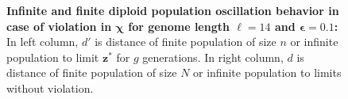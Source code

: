 \begin{figure}[h]
\begin{center}
\hspace{-3em}%
\vspace{-0.5em}  \hspace{-3em}%


\caption{\textbf{Infinite and finite diploid population oscillation behavior in case of violation in $\bm{\chi}$ for genome length $\ell = 14$ and $\bm{\epsilon} = 0.1$:} 
  In left column, $d'$ is distance of finite population of size $n$ or infinite population to limit $\bm{z}^\ast$ for $g$ generations. In right column, $d$ is distance of finite population of size $N$ or infinite population to limits without violation.}
\label{oscillation_14d_vio_chi_0.1}
\end{center}
\end{figure}

